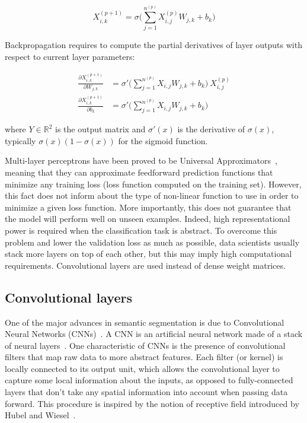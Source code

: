         \begin{equation}
            X_{i, k}^{(p+1)} = \sigma \Big( \sum\limits_{j=1}^{n^{(p)}} X^{(p)}_{i, j} W_{j, k} + b_{k} \Big)
        \end{equation}

        Backpropagation requires to compute the partial derivatives of layer outputs with respect to current layer parameters:

        \begin{align}
            \frac{\partial X_{i, k}^{(p+1)}}{\partial W_{j, k}} & = \sigma' \Big( \sum\limits_{j=1}^{n^{(p)}} X_{i, j} W_{j, k} + b_{k} \Big) \ X_{i, j}^{(p)} \\
            \frac{\partial X_{i, k}^{(p+1)}}{\partial b_{k}} & = \sigma' \Big( \sum\limits_{j=1}^{n^{(p)}} X_{i, j} W_{j, k} + b_{k} \Big)
        \end{align}

        where $Y \in \mathbb{R}^2$ is the output matrix and $\sigma'(x)$ is the derivative of $\sigma(x)$,
        typically $\sigma(x) (1 - \sigma(x))$ for the sigmoid function.

        Multi-layer perceptrons have been proved to be Universal Approximators~\cite{hornik1991approximation},
        meaning that they can approximate feedforward prediction functions that minimize any training loss (loss function computed on the training set).
        However, this fact does not inform about the type of non-linear function to use in order to minimize
        a given loss function. More importantly, this does not guarantee that the model will perform well on unseen examples.
        Indeed, high representational power is required when the classification task is abstract.
        To overcome this problem and lower the validation loss as much as possible, data scientists usually stack more layers on top of each other,
        but this may imply high computational requirements. Convolutional layers are used instead of dense weight matrices.

    \subsection{Convolutional layers} \label{convlayers}

        One of the major advances in semantic segmentation
        is due to Convolutional Neural Networks (CNNs)~\cite{DBLP:journals/corr/Garcia-GarciaOO17}.
        A CNN is an artificial neural network made of a stack of neural layers~\cite{lecun1998gradient}. One characteristic of CNNs is the
        presence of convolutional filters that map raw data to more abstract features. Each filter (or kernel) is locally connected to its output unit, which
        allows the convolutional layer to capture some local information about the inputs, as opposed to fully-connected layers that don't take any spatial
        information into account when passing data forward. This procedure is inspired by the notion of receptive field introduced 
        by Hubel and Wiesel~\cite{Hubel1962}.

